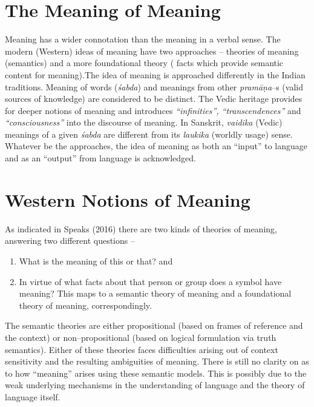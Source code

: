 \section*{The Meaning of Meaning}

Meaning has a wider connotation than the meaning in a verbal sense. The modern (Western) ideas of meaning have two approaches – theories of meaning (semantics) and a more foundational theory ( facts which provide semantic content for meaning).The idea of meaning is approached differently in the Indian traditions. Meaning of words (\textit{śabda}) and meanings from other \textit{pramāṇa}–s (valid sources of knowledge) are considered to be distinct. The Vedic heritage provides for deeper notions of meaning and introduces \textit{“infinities”, “transcendences”} and \textit{“consciousness”} into the discourse of meaning. In Sanskrit, \textit{vaidika} (Vedic) meanings of a given \textit{śabda} are different from its \textit{laukika} (worldly usage) sense. Whatever be the approaches, the idea of meaning as both an “input” to language and as an “output” from language is acknowledged.

\newpage


\section*{Western Notions of Meaning}

\vskip -5pt

As indicated in Speaks (2016) there are two kinds of theories of meaning, answering two different questions –

\begin{enumerate}
\itemsep=0pt
\item What is the meaning of this or that? and

 \item In virtue of what facts about that person or group does a symbol have meaning? This maps to a semantic theory of meaning and a foundational theory of meaning, correspondingly.

\end{enumerate}

The semantic theories are either propositional (based on frames of reference and the context) or non–propositional (based on logical formulation via truth semantics). Either of these theories faces difficulties arising out of context sensitivity and the resulting ambiguities of meaning. There is still no clarity on as to how “meaning” arises using these semantic models. This is possibly due to the weak underlying mechanisms in the understanding of language and the theory of language itself.

